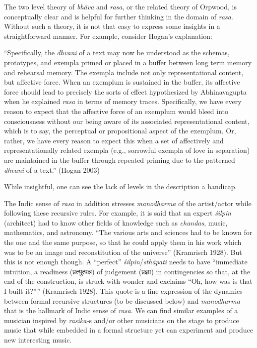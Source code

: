 The two level theory of \textsl{bhāva} and \textsl{rasa}, or the related theory of Orpwood, is conceptually clear and is helpful for further thinking in the domain of \textsl{rasa}. Without such a theory, it is not that easy to express some insights in a straightforward manner. For example, consider Hogan’s explanation: 

\begin{myquote}
“Specifically, the \textsl{dhvani} of a text may now be understood as the schemas, prototypes, and exempla primed or placed in a buffer between long term memory and rehearsal memory. The exempla include not only representational content, but affective force. When an exemplum is sustained in the buffer, its affective force should lead to precisely the sorts of effect hypothesized by Abhinavagupta when he explained \textsl{rasa} in terms of memory traces. Specifically, we have every reason to expect that the affective force of an exemplum would bleed into consciousness without our being aware of its associated representational content, which is to say, the perceptual or propositional aspect of the exemplum. Or, rather, we have every reason to expect this when a set of affectively and representationally related exempla (e.g., sorrowful exempla of love in separation) are maintained in the buffer through repeated priming due to the patterned \textsl{dhvani} of a text.” 
\hfill(Hogan 2003)
\end{myquote}

While insightful, one can see the lack of levels in the description a handicap.

The Indic sense of \textsl{rasa} in addition stresses \textsl{manodharma} of the artist/actor while following these recursive rules. For example, it is said that an expert \textsl{śilpin} (architect) had to know other fields of knowledge such as \textsl{chandas}, music, mathematics, and astronomy. “The various arts and sciences had to be known for the one and the same purpose, so that he could apply them in his work which was to be an image and reconstitution of the universe” (Kramrisch 1928). But this is not enough though. A “perfect” \textsl{śilpin}/\textsl{sthāpati} needs to have “immediate intuition, a readiness ({\dev प्रत्युत्पन्न}) of judgement ({\dev प्रज्ञा}) in contingencies so that, at the end of the construction, is struck with wonder and exclaims “Oh, how was is that I built it?”” (Kramrisch 1928). This quote is a fine expression of the dynamics between formal recursive structures (to be discussed below) and \textsl{manodharma} that is the hallmark of Indic sense of \textsl{rasa}. We can find similar examples of a musician inspired by \textsl{rasika-}s and/or other musicians on the stage to produce music that while embedded in a formal structure yet can experiment and produce new interesting music.

